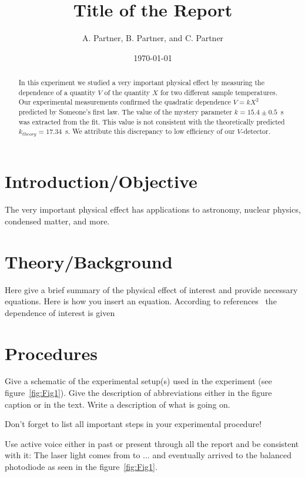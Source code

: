 \documentclass[letterpaper,12pt]{article}
\begin{document}
\title{Title of the Report}
\author{A. Partner, B. Partner, and C. Partner}
\date{\today}
\maketitle

\begin{abstract}
In this experiment we studied a very important physical effect by measuring the
dependence of a quantity $V$ of the quantity $X$ for two different sample
temperatures.  Our experimental measurements confirmed the quadratic dependence
$V = kX^2$ predicted by Someone's first law. The value of the mystery parameter
$k = 15.4\pm 0.5$~s was extracted from the fit. This value is
not consistent with the theoretically predicted $k_{theory}=17.34$~s. We attribute this
discrepancy to low efficiency of our $V$-detector.
\end{abstract}


\section{Introduction/Objective}

The very important physical effect has applications to astronomy, nuclear physics, condensed matter, and more. 


\section{Theory/Background}

Here give a brief summary of the physical effect of interest and provide
necessary equations. Here is how you insert an equation. According to
references~\cite{melissinos, Cyr, Wiki} the dependence of interest is given

\section{Procedures}

Give a schematic of the experimental setup(s) used in the experiment (see
figure~\ref{fig:Fig1}). Give the description of  abbreviations
either in the figure caption or in the text. Write a description of what is
going on. 

Don't forget to list all important steps in your experimental procedure!

Use active voice either in past or present through all the report and be
consistent with it:
The laser light comes  from to ... and eventually arrived to the
balanced photodiode as seen in the figure~\ref{fig:Fig1}.
\end{document}
